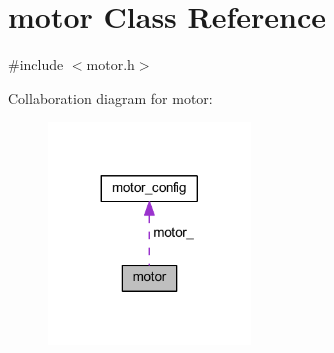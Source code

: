 \hypertarget{classmotor}{}\section{motor Class Reference}
\label{classmotor}


{\ttfamily \#include $<$motor.\+h$>$}



Collaboration diagram for motor\+:
\nopagebreak
\begin{figure}[H]
\begin{center}
\leavevmode
\includegraphics[width=152pt]{classmotor__coll__graph}
\end{center}
\end{figure}
